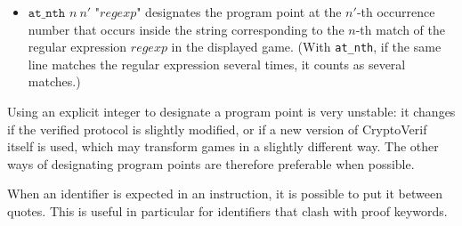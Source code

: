 \documentclass{article}
\begin{document}
\begin{itemize}
\item $\texttt{at\_nth }n\ n'\texttt{ "}\mathit{regexp}\texttt{"}$
  designates the program point at the $n'$-th occurrence number
  that occurs inside the string corresponding to the
  $n$-th match of the regular expression
  $\mathit{regexp}$ in the displayed game.
  (With \texttt{at\_nth}, if the same line matches the regular expression
  several times, it counts as several matches.)

\end{itemize}
Using an explicit integer to designate a program point is very unstable:
it changes if the verified protocol is slightly modified, or
if a new version of CryptoVerif itself is used, which may transform
games in a slightly different way.
The other ways of designating program points are therefore preferable
when possible.

When an identifier is expected in an instruction, it is possible
to put it between quotes. This is useful in particular for identifiers
that clash with proof keywords.
\end{document}
